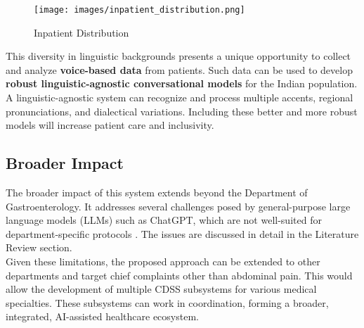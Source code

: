 \begin{figure}[h]
    \centering
    \texttt{[image: images/inpatient\_distribution.png]}
    \caption{Inpatient Distribution}
    \label{fig:inpatient_distribution}
\end{figure}

\noindent This diversity in linguistic backgrounds presents a unique opportunity to collect and analyze \textcolor{TUMRed}{\textbf{voice-based data}} from patients. Such data can be used to develop \textcolor{TUMRed}{\textbf{robust linguistic-agnostic conversational models}} for the Indian population. A linguistic-agnostic system can recognize and process multiple accents, regional pronunciations, and dialectical variations. Including these better and more robust models will increase patient care and inclusivity.

\subsection{Broader Impact}
The broader impact of this system extends beyond the Department of Gastroenterology. It addresses several challenges posed by general-purpose large language models (LLMs) such as ChatGPT, which are not well-suited for department-specific protocols \cite{clusmann2023future}. The issues are discussed in detail in the Literature Review section.\\[\baselineskip]

\noindent Given these limitations, the proposed approach can be extended to other departments and target chief complaints other than abdominal pain. This would allow the development of multiple CDSS subsystems for various medical specialties. These subsystems can work in coordination, forming a broader, integrated, AI-assisted healthcare ecosystem.\\[\baselineskip]